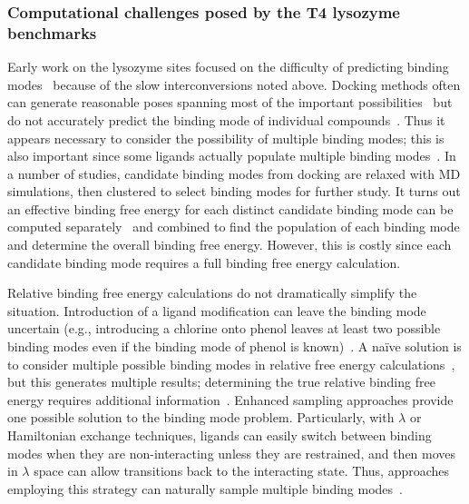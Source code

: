 \documentclass[aps,pre,twocolumn,nofootinbib,superscriptaddress,10pt, final,tightenlines]{revtex4-1}
\begin{document}
\subsubsection{Computational challenges posed by the T4 lysozyme benchmarks}
Early work on the lysozyme sites focused on the difficulty of predicting binding modes~\cite{mobley_use_2006, mobley_predicting_2007, boyce_predicting_2009} because of the slow interconversions noted above. 
Docking methods often can generate reasonable poses spanning most of the important possibilities~\cite{mobley_use_2006, mobley_predicting_2007, boyce_predicting_2009, graves_rescoring_2008} but do not accurately predict the binding mode of individual compounds~\cite{mobley_predicting_2007, boyce_predicting_2009, graves_rescoring_2008}. 
Thus it appears necessary to consider the possibility of multiple binding modes; this is also important since some ligands actually populate multiple binding modes~\cite{boyce_predicting_2009}. 
In a number of studies, candidate binding modes from docking are relaxed with MD simulations, then clustered to select binding modes for further study. 
It turns out an effective binding free energy for each distinct candidate binding mode can be computed separately~\cite{mobley_use_2006} and combined to find the population of each binding mode and determine the overall binding free energy.
However, this is costly since each candidate binding mode requires a full binding free energy calculation.

Relative binding free energy calculations do not dramatically simplify the situation. 
Introduction of a ligand modification can leave the binding mode uncertain (e.g., introducing a chlorine onto phenol leaves at least two possible binding modes even if the binding mode of phenol is known)~\cite{boyce_predicting_2009}. 
A na{\" i}ve solution is to consider multiple possible binding modes in relative free energy calculations~\cite{boyce_predicting_2009}, but this generates multiple results; determining the true relative binding free energy requires additional information~\cite{mobley_perspective_2012}. Enhanced sampling approaches provide one possible solution to the binding mode problem. 
Particularly, with $\lambda$ or Hamiltonian exchange techniques, ligands can easily switch between binding modes when they are non-interacting unless they are restrained, and then moves in $\lambda$ space can allow transitions back to the interacting state.
Thus, approaches employing this strategy can naturally sample multiple binding modes~\cite{gallicchio_binding_2010, wang_identifying_2013}.
\end{document}
